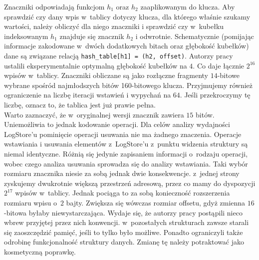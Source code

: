 \documentclass[declaration,shortabstract,masc]{iithesis}
\begin{document}
			\indent Znaczniki odpowiadają funkcjom $h_1$ oraz $h_2$ zaaplikowanym do klucza. Aby sprawdzić czy dany wpis w~tablicy dotyczy klucza, dla którego właśnie szukamy wartości, należy obliczyć dla niego znaczniki i sprawdzić czy w~kubełku indeksowanym $h_1$ znajduje się znacznik $h_2$ i odwrotnie. Schematycznie (pomijając informacje zakodowane w~dwóch dodatkowych bitach oraz głębokość kubełków) dane są związane relacją \texttt{hash\_table[h1] = (h2, offset)}. Autorzy pracy \cite{SILT} ustalili eksperymentalnie optymalną głębokość kubełków na $4$. Co daje łącznie $2^{16}$ wpisów w~tablicy. Znaczniki obliczane są jako rozłączne fragmenty $14$-bitowe wybrane spośród najmłodszych bitów 160-bitowego klucza. Przyjmujemy również ograniczenie na liczbę iteracji wstawień i wypychań na $64$. Jeśli przekroczymy tę liczbę, oznacz to, że tablica jest już prawie pełna.\\
			\indent Warto zaznaczyć, że w~oryginalnej wersji znacznik zawiera $15$ bitów. Uniemożliwia to jednak kodowanie operacji. Dla celów analizy wydajności LogStore'u pominięcie operacji usuwania nie ma żadnego znaczenia. Operacje wstawiania i usuwania elementów z~LogStore'u z~punktu widzenia struktury są niemal identyczne. Różnią się jedynie zapisaniem informacji o~rodzaju operacji, wobec czego analiza usuwania sprowadza się do analizy wstawiania. Taki wybór rozmiaru znacznika niesie za sobą jednak dwie konsekwencje. z~jednej strony zyskujemy dwukrotnie większą przestrzeń adresową, przez co mamy do dyspozycji $2^{17}$ wpisów w~tablicy. Jednak pociąga to za sobą konieczność rozszerzenia rozmiaru wpisu o~$2$ bajty. Zwiększa się wówczas rozmiar offsetu, gdyż zmienna $16$-bitowa byłaby niewystarczająca. Wydaje się, że autorzy pracy postąpili nieco wbrew przyjętej przez nich konwencji. w~pozostałych strukturach zawsze starali się zaoszczędzić pamięć, jeśli to tylko było możliwe. Ponadto ograniczyli także odrobinę funkcjonalność struktury danych. Zmianę tę należy potraktować jako kosmetyczną poprawkę.\\
\end{document}
